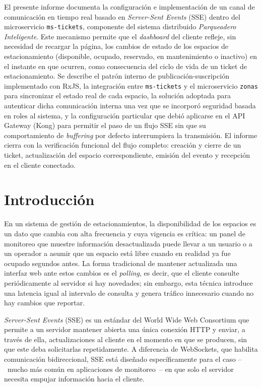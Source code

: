\documentclass[12pt,letterpaper]{article}
\begin{document}
El presente informe documenta la configuración e implementación de un canal de comunicación en tiempo real basado en \emph{Server-Sent Events} (SSE) dentro del microservicio \texttt{ms-tickets}, componente del sistema distribuido \emph{Parqueadero Inteligente}. Este mecanismo permite que el \emph{dashboard} del cliente refleje, sin necesidad de recargar la página, los cambios de estado de los espacios de estacionamiento (disponible, ocupado, reservado, en mantenimiento o inactivo) en el instante en que ocurren, como consecuencia del ciclo de vida de un ticket de estacionamiento. Se describe el patrón interno de publicación-suscripción implementado con RxJS, la integración entre \texttt{ms-tickets} y el microservicio \texttt{zonas} para sincronizar el estado real de cada espacio, la solución adoptada para autenticar dicha comunicación interna una vez que se incorporó seguridad basada en roles al sistema, y la configuración particular que debió aplicarse en el API Gateway (Kong) para permitir el paso de un flujo SSE sin que su comportamiento de \emph{buffering} por defecto interrumpiera la transmisión. El informe cierra con la verificación funcional del flujo completo: creación y cierre de un ticket, actualización del espacio correspondiente, emisión del evento y recepción en el cliente conectado.

\newpage

\section{Introducción}

En un sistema de gestión de estacionamientos, la disponibilidad de los espacios es un dato que cambia con alta frecuencia y cuya vigencia es crítica: un panel de monitoreo que muestre información desactualizada puede llevar a un usuario o a un operador a asumir que un espacio está libre cuando en realidad ya fue ocupado segundos antes. La forma tradicional de mantener actualizada una interfaz web ante estos cambios es el \emph{polling}, es decir, que el cliente consulte periódicamente al servidor si hay novedades; sin embargo, esta técnica introduce una latencia igual al intervalo de consulta y genera tráfico innecesario cuando no hay cambios que reportar.

\emph{Server-Sent Events} (SSE) es un estándar del World Wide Web Consortium que permite a un servidor mantener abierta una única conexión HTTP y enviar, a través de ella, actualizaciones al cliente en el momento en que se producen, sin que este deba solicitarlas repetidamente. A diferencia de WebSockets, que habilita comunicación bidireccional, SSE está diseñado específicamente para el caso --~mucho más común en aplicaciones de monitoreo~-- en que solo el servidor necesita empujar información hacia el cliente.
\end{document}
